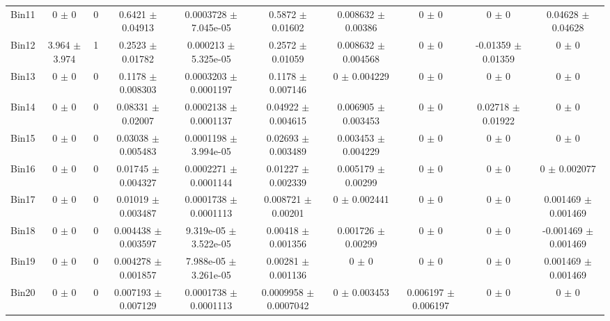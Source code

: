 \begin{tabular}{@{\extracolsep{4pt}}lccccccccc@{}}
     Bin11 & 0 $\pm$ 0 & 0 & 0.6421 $\pm$ 0.04913 & 0.0003728 $\pm$ 7.045e-05 & 0.5872 $\pm$ 0.01602 & 0.008632 $\pm$ 0.00386 & 0 $\pm$ 0 & 0 $\pm$ 0 & 0.04628 $\pm$ 0.04628 \\ 
     Bin12 & 3.964 $\pm$ 3.974 & 1 & 0.2523 $\pm$ 0.01782 & 0.000213 $\pm$ 5.325e-05 & 0.2572 $\pm$ 0.01059 & 0.008632 $\pm$ 0.004568 & 0 $\pm$ 0 & -0.01359 $\pm$ 0.01359 & 0 $\pm$ 0 \\ 
     Bin13 & 0 $\pm$ 0 & 0 & 0.1178 $\pm$ 0.008303 & 0.0003203 $\pm$ 0.0001197 & 0.1178 $\pm$ 0.007146 & 0 $\pm$ 0.004229 & 0 $\pm$ 0 & 0 $\pm$ 0 & 0 $\pm$ 0 \\ 
     Bin14 & 0 $\pm$ 0 & 0 & 0.08331 $\pm$ 0.02007 & 0.0002138 $\pm$ 0.0001137 & 0.04922 $\pm$ 0.004615 & 0.006905 $\pm$ 0.003453 & 0 $\pm$ 0 & 0.02718 $\pm$ 0.01922 & 0 $\pm$ 0 \\ 
     Bin15 & 0 $\pm$ 0 & 0 & 0.03038 $\pm$ 0.005483 & 0.0001198 $\pm$ 3.994e-05 & 0.02693 $\pm$ 0.003489 & 0.003453 $\pm$ 0.004229 & 0 $\pm$ 0 & 0 $\pm$ 0 & 0 $\pm$ 0 \\ 
     Bin16 & 0 $\pm$ 0 & 0 & 0.01745 $\pm$ 0.004327 & 0.0002271 $\pm$ 0.0001144 & 0.01227 $\pm$ 0.002339 & 0.005179 $\pm$ 0.00299 & 0 $\pm$ 0 & 0 $\pm$ 0 & 0 $\pm$ 0.002077 \\ 
     Bin17 & 0 $\pm$ 0 & 0 & 0.01019 $\pm$ 0.003487 & 0.0001738 $\pm$ 0.0001113 & 0.008721 $\pm$ 0.00201 & 0 $\pm$ 0.002441 & 0 $\pm$ 0 & 0 $\pm$ 0 & 0.001469 $\pm$ 0.001469 \\ 
     Bin18 & 0 $\pm$ 0 & 0 & 0.004438 $\pm$ 0.003597 & 9.319e-05 $\pm$ 3.522e-05 & 0.00418 $\pm$ 0.001356 & 0.001726 $\pm$ 0.00299 & 0 $\pm$ 0 & 0 $\pm$ 0 & -0.001469 $\pm$ 0.001469 \\ 
     Bin19 & 0 $\pm$ 0 & 0 & 0.004278 $\pm$ 0.001857 & 7.988e-05 $\pm$ 3.261e-05 & 0.00281 $\pm$ 0.001136 & 0 $\pm$ 0 & 0 $\pm$ 0 & 0 $\pm$ 0 & 0.001469 $\pm$ 0.001469 \\ 
     Bin20 & 0 $\pm$ 0 & 0 & 0.007193 $\pm$ 0.007129 & 0.0001738 $\pm$ 0.0001113 & 0.0009958 $\pm$ 0.0007042 & 0 $\pm$ 0.003453 & 0.006197 $\pm$ 0.006197 & 0 $\pm$ 0 & 0 $\pm$ 0 \\ 
\hline\hline
  \end{tabular}
